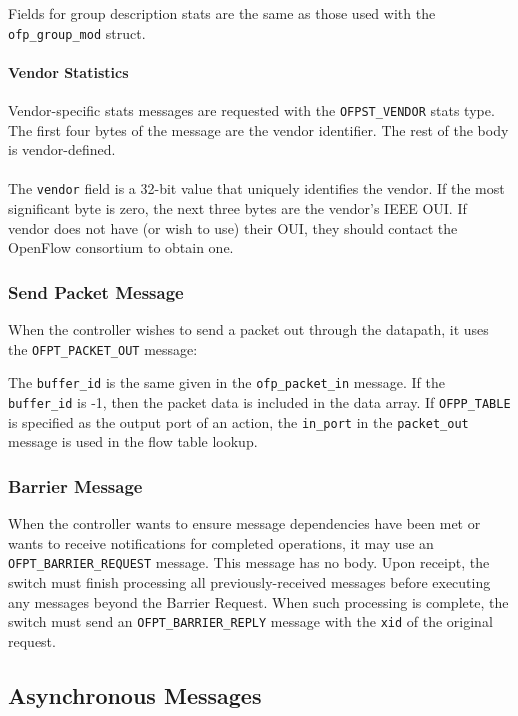
Fields for group description stats are the same as those used with the \verb|ofp_group_mod| struct.

\paragraph{Vendor Statistics}
Vendor-specific stats messages are requested with the \verb|OFPST_VENDOR| stats type. The first four bytes of the message are the vendor identifier. The rest of the body is vendor-defined.
\\\\
The \verb|vendor| field is a 32-bit value that uniquely identifies the vendor. If the most significant byte is zero, the next three bytes are the vendor's IEEE OUI. If vendor does not have (or wish to use) their OUI, they should contact the OpenFlow consortium to obtain one. 

\subsubsection{Send Packet Message}
When the controller wishes to send a packet out through the datapath, it uses the \verb|OFPT_PACKET_OUT| message:


The \verb|buffer_id| is the same given in the \verb|ofp_packet_in| message.  If the \verb|buffer_id| is -1, then the packet data is included in the data array. If \verb|OFPP_TABLE| is specified as the output port of an action, the \verb|in_port| in the \verb|packet_out| message is used in the flow table lookup.

\subsubsection{Barrier Message}
When the controller wants to ensure message dependencies have been met or wants to receive notifications for completed operations, it may use an \verb|OFPT_BARRIER_REQUEST| message.  This message has no body.  Upon receipt, the switch must finish processing all previously-received messages before executing any messages beyond the Barrier Request.  When such processing is complete, the switch must send an \verb|OFPT_BARRIER_REPLY| message with the \verb|xid| of the original request.

\subsection{Asynchronous Messages}
